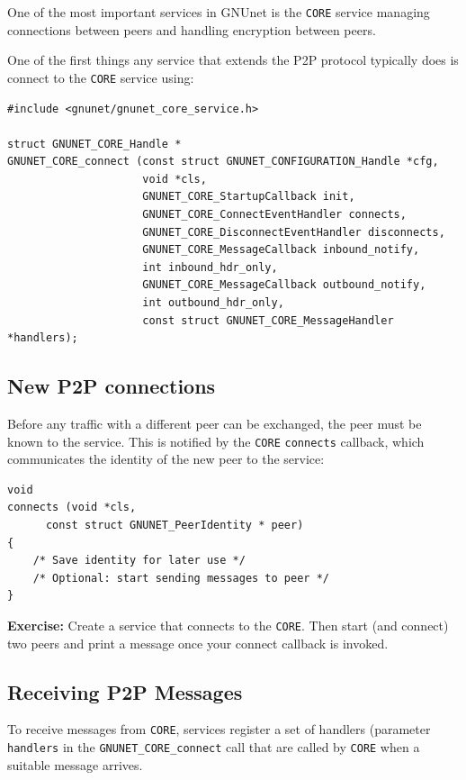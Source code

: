 \documentclass[10pt]{article}
\newcommand{\exercise}[1]{\noindent\begin{boxedminipage}{\textwidth}{\bf Exercise:} #1 \end{boxedminipage}}
\begin{document}
One of the most important services in GNUnet is the \texttt{CORE} service 
managing connections between peers and handling encryption between peers.

One of the first things any service that extends the P2P protocol typically does
is connect to the \texttt{CORE} service using:

\lstset{language=C}
\begin{lstlisting}
#include <gnunet/gnunet_core_service.h>

struct GNUNET_CORE_Handle *
GNUNET_CORE_connect (const struct GNUNET_CONFIGURATION_Handle *cfg,
                     void *cls,
                     GNUNET_CORE_StartupCallback init,
                     GNUNET_CORE_ConnectEventHandler connects,
                     GNUNET_CORE_DisconnectEventHandler disconnects,
                     GNUNET_CORE_MessageCallback inbound_notify,
                     int inbound_hdr_only,
                     GNUNET_CORE_MessageCallback outbound_notify,
                     int outbound_hdr_only,
                     const struct GNUNET_CORE_MessageHandler *handlers);
\end{lstlisting}

\subsection{New P2P connections}

Before any traffic with a different peer can be exchanged, the peer must be
known to the service. This is notified by the \texttt{CORE} {\tt connects} callback,
which communicates the identity of the new peer to the service:

\lstset{language=C}
\begin{lstlisting}
void
connects (void *cls,
	  const struct GNUNET_PeerIdentity * peer)
{
    /* Save identity for later use */
    /* Optional: start sending messages to peer */
}
\end{lstlisting}

\exercise{Create a service that connects to the \texttt{CORE}.  Then
start (and connect) two peers and print a message once your connect
callback is invoked.}

\subsection{Receiving P2P Messages}

To receive messages from \texttt{CORE}, services register a set of handlers
(parameter {\tt *handlers} in the \lstinline|GNUNET_CORE_connect| call that are called by \texttt{CORE}
when a suitable message arrives.
\end{document}
